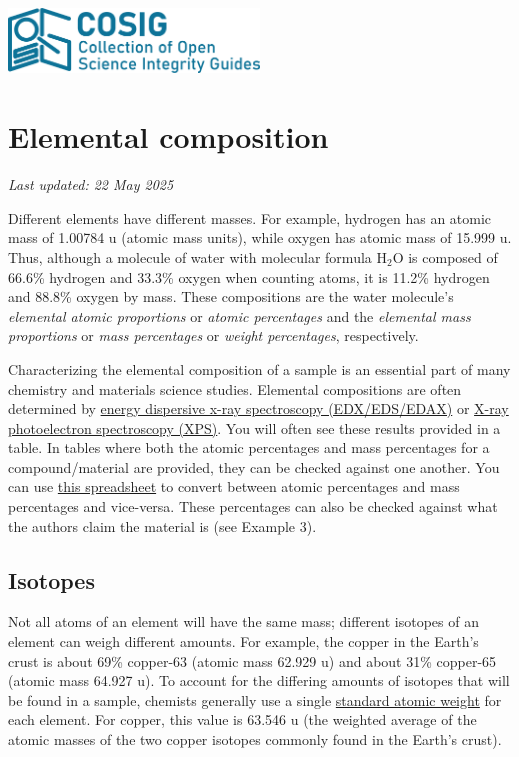 \documentclass[letterpaper, 12pt]{article}
\begin{document}
\flushleft
\includegraphics[width=0.5\textwidth]{img/home/241017_final_logo_mockup.png}

\section*{Elemental composition}
\textit{Last updated: 22 May 2025}

Different elements have different masses. For example, hydrogen has an atomic mass of 1.00784 u (atomic mass units), while oxygen has atomic mass of 15.999 u. Thus, although a molecule of water with molecular formula H$_2$O is composed of 66.6\% hydrogen and 33.3\% oxygen when counting atoms, it is 11.2\% hydrogen and 88.8\% oxygen by mass. These compositions are the water molecule's \textit{elemental atomic proportions} or \textit{atomic percentages} and the \textit{elemental mass proportions} or \textit{mass percentages} or \textit{weight percentages}, respectively.

Characterizing the elemental composition of a sample is an essential part of many chemistry and materials science studies. Elemental compositions are often determined by \href{https://en.wikipedia.org/wiki/Energy-dispersive_X-ray_spectroscopy}{energy dispersive x-ray spectroscopy (EDX/EDS/EDAX)} or \href{https://en.wikipedia.org/wiki/X-ray_photoelectron_spectroscopy}{X-ray photoelectron spectroscopy (XPS)}. You will often see these results provided in a table. In tables where both the atomic percentages and mass percentages for a compound/material are provided, they can be checked against one another. You can use \href{https://osf.io/gp4mf}{this spreadsheet} to convert between atomic percentages and mass percentages and vice-versa. These percentages can also be checked against what the authors claim the material is (see Example 3).

\subsection*{Isotopes}

Not all atoms of an element will have the same mass; different isotopes of an element can weigh different amounts. For example, the copper in the Earth's crust is about 69\% copper-63 (atomic mass 62.929 u) and about 31\% copper-65 (atomic mass 64.927 u). To account for the differing amounts of isotopes that will be found in a sample, chemists generally use a single \href{https://en.wikipedia.org/wiki/Standard_atomic_weight}{standard atomic weight} for each element. For copper, this value is 63.546 u (the weighted average of the atomic masses of the two copper isotopes commonly found in the Earth's crust).
\end{document}
